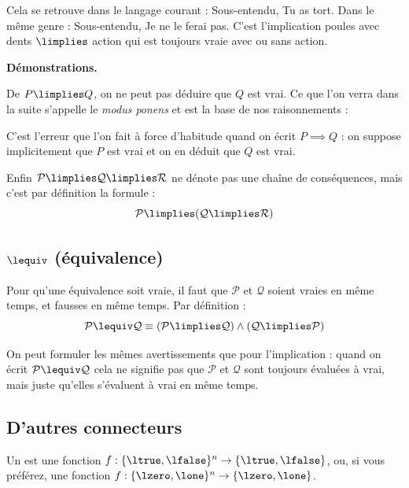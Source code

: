\documentclass[11pt,class=report,crop=false]{standalone}
\begin{document}
Cela se retrouve dans le langage courant :
Sous-entendu, \og{}Tu as tort.\fg{}
Dans le même genre :
Sous-entendu, \og{}Je ne le ferai pas.\fg{} C'est l'implication \og{}poules avec dents $\limplies$ action\fg{} qui est toujours vraie avec ou sans action.


\medskip

\textbf{Démonstrations.}

De $P \limplies Q$, on ne peut pas déduire que $Q$ est vrai. Ce que l'on verra dans la suite s'appelle le \emph{modus ponens} et est la base de nos raisonnements :

C'est l'erreur que l'on fait à force d'habitude quand on écrit $P \implies Q$ : on suppose implicitement que $P$ est vrai et on en déduit que $Q$ est vrai.

Enfin $\mathcal{P} \limplies \mathcal{Q} \limplies \mathcal{R}$ ne dénote pas une chaîne de conséquences, mais c'est par définition la formule :
\[ \mathcal{P} \limplies (\mathcal{Q} \limplies \mathcal{R}) \]



\subsection{$\lequiv$ (équivalence)}

Pour qu'une équivalence soit vraie, il faut que $\mathcal{P}$ et $\mathcal{Q}$ soient vraies en même temps, et fausses en même temps.
Par définition :
\[ \mathcal{P} \lequiv \mathcal{Q} \equiv (\mathcal{P} \limplies \mathcal{Q}) \land (\mathcal{Q} \limplies \mathcal{P}) \]

On peut formuler les mêmes avertissements que pour l'implication : quand on écrit $\mathcal{P} \lequiv \mathcal{Q}$ cela ne signifie pas que $\mathcal{P}$ et $\mathcal{Q}$ sont toujours évaluées à vrai, mais juste qu'elles s'évaluent à vrai en même temps.
 

\subsection{D'autres connecteurs}

Un  est une fonction $f : \{\ltrue, \lfalse\}^n \to \{\ltrue, \lfalse\}$, ou, si vous préférez, une fonction $f : \{\lzero, \lone\}^n \to \{\lzero, \lone\}$.
\end{document}
